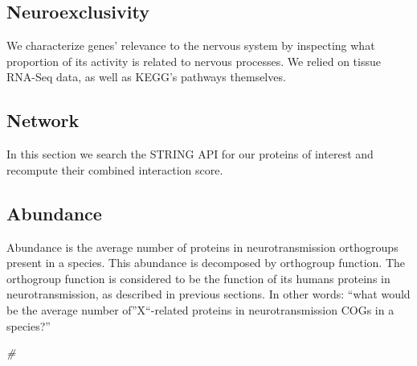 \documentclass[
]{article}
\newenvironment{Shaded}{\begin{snugshade}}{\end{snugshade}}
\newcommand{\CommentTok}[1]{\textcolor[rgb]{0.33,0.33,0.33}{\textit{#1}}}
\renewenvironment{Shaded}{\scriptsize\begin{blackbox}}{\end{blackbox}}
\begin{document}
\hypertarget{neuroexclusivity-1}{%
\subsection{Neuroexclusivity}\label{neuroexclusivity-1}}

We characterize genes' relevance to the nervous system by inspecting
what proportion of its activity is related to nervous processes. We
relied on tissue RNA-Seq data, as well as KEGG's pathways themselves.


\hypertarget{network-1}{%
\subsection{Network}\label{network-1}}

In this section we search the STRING API for our proteins of interest
and recompute their combined interaction score.


\hypertarget{abundance}{%
\subsection{Abundance}\label{abundance}}

Abundance is the average number of proteins in neurotransmission
orthogroups present in a species. This abundance is decomposed by
orthogroup function. The orthogroup function is considered to be the
function of its humans proteins in neurotransmission, as described in
previous sections. In other words: ``what would be the average number
of''X``-related proteins in neurotransmission COGs in a species?''


\begin{Shaded}
\begin{Highlighting}[numbers=left,,]
\CommentTok{#}
\end{Highlighting}
\end{Shaded}
\end{document}

